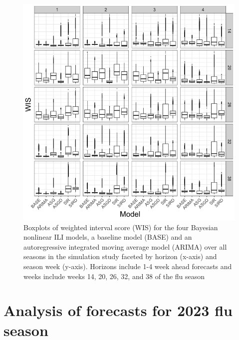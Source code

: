 \begin{figure}[hbt!]
    \centering
    \includegraphics[scale=.4]{Images/wis_by_week_horizon.png}
    \caption{Boxplots of weighted interval score (WIS) for the 
    four Bayesian nonlinear ILI models, a baseline model (BASE) and
    an autoregressive integrated moving average model (ARIMA) 
    over all seasons in the simulation study faceted by horizon 
    (x-axis) and season week (y-axis). Horizons include 1-4 week ahead forecasts 
    and weeks include weeks 14, 20, 26, 32, and 38 of the flu season}
    \label{fig:wis_by_week_horizon}
\end{figure}

































\section{Analysis of forecasts for 2023 flu season}
\label{sec:analysis}

